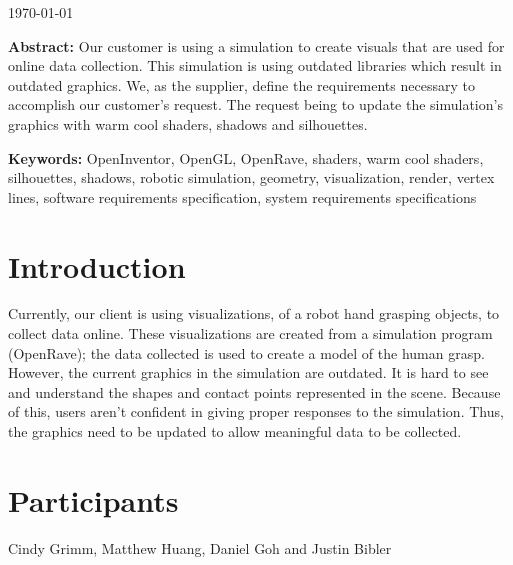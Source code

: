 \documentclass[10pt,journal,compsoc,draftclsnofoot]{IEEEtran}
\begin{document}
\begin{titlepage}
\begin{flushleft}
\today

\vfill

\begin{normalsize}
{\bf Abstract:}
Our customer is using a simulation to create visuals that are used for online data collection.
This simulation is using outdated libraries which result in outdated graphics.
We, as the supplier, define the requirements necessary to accomplish our customer's request.
The request being to update the simulation's graphics with warm cool shaders, shadows and silhouettes.

{\bf Keywords:} OpenInventor, OpenGL, OpenRave, shaders, warm cool shaders, silhouettes, shadows, robotic simulation, geometry, visualization, render,
vertex lines, software requirements specification, system requirements specifications
\end{normalsize}
\end{flushleft}

\newpage

\end{titlepage}

\section*{Introduction}
\vspace{3mm}
Currently, our client is using visualizations, of a robot hand grasping objects, to collect data online.
These visualizations are created from a simulation program (OpenRave); the data collected is used to create a model of the human grasp.
However, the current graphics in the simulation are outdated.
It is hard to see and understand the shapes and contact points represented in the scene.
Because of this, users aren't confident in giving proper responses to the simulation.
Thus, the graphics need to be updated to allow meaningful data to be collected. \\


\section*{Participants}
\vspace{3mm}
Cindy Grimm, Matthew Huang, Daniel Goh and Justin Bibler \\ 

\newpage

\tableofcontents
\end{document}
